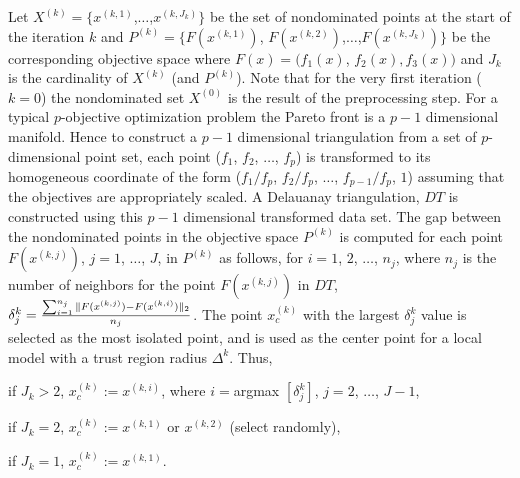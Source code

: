 \smallskip

\noindent Let $X^{(k)} = \bigl\{x^{(k,1)}$,$\ldots$,$x^{(k,J_k)}\bigr\}$ be the 
set of nondominated points at the start of the iteration $k$ and 
$P^{(k)} = \bigl\{F(x^{(k,1)})$, $F(x^{(k,2)})$,$\ldots$,$F(x^{(k,J_k)})\bigr
\}$ be the corresponding objective space where $F(x) = \bigl (f_1(x)$, 
$f_2(x), f_3(x)\bigr )$ and $J_{k}$ is the cardinality of $X^{(k)}$ (and 
$P^{(k)}$). Note that for the very first iteration ($k=0$) the nondominated 
set $X^{(0)}$ is the result of the preprocessing step. For a typical 
$p$-objective optimization problem the Pareto front is a $p-1$ dimensional 
manifold. Hence to construct a $p-1$ dimensional triangulation from a set of
$p$-dimensional point set,  each point ($f_1$, $f_2$, $\ldots$, $f_p$) is
transformed to its homogeneous coordinate of the form ($f_1/f_p$, $f_2/f_p$,
$\ldots$, ${f_{p-1}}/f_p$, $1$) assuming that the objectives are appropriately
scaled. A Delauanay triangulation, $DT$ is constructed using this $p-1$
dimensional transformed data set. The gap between the nondominated points in
the objective space $P^{(k)}$ is computed for each point $F(x^{(k,j)})$, $j=1$,
$\ldots$, $J$, in $P^{(k)}$ as follows, 
for $i=1$, $2$, $\ldots$, $n_j$, where $n_j$ is the number of neighbors for 
the point $F(x^{(k,j)})$ in $DT$,
$\delta_j^k={{\sum_{i=1}^{n_j}{\|F(x^{(k,j)})-F(x^{(k,i)})\|_2}}\over {n_j}}$. 
The point $x_c^{(k)}$ with the largest $\delta_j^k$ 
value is selected as the most isolated point, and is used as the center point 
for a local model with a trust region radius $\Delta^k$. Thus,

\noindent if $J_k > 2$, $x_c^{(k)} := x^{(k,i)}$, where $i=$\hbox{argmax}
$[\delta_j^k]$, $j=2$, $\ldots$, $J-1$,

\noindent if $J_k = 2$,  $x_c^{(k)} := x^{(k,1)}$ or $x^{(k,2)}$ (select 
randomly),

\noindent if $J_k = 1$, $x_c^{(k)} := x^{(k,1)}$.

